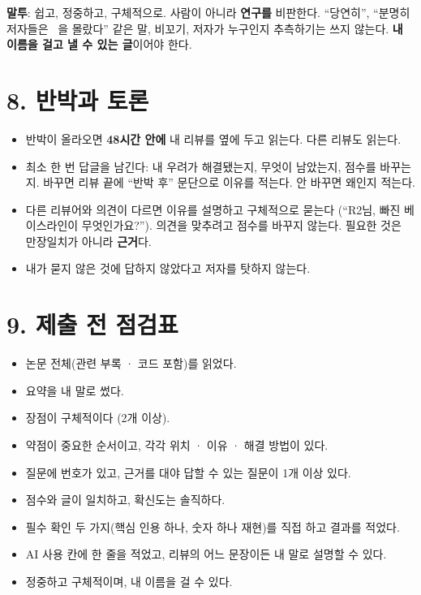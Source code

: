 \documentclass[11pt]{article}
\begin{document}
\noindent\textbf{말투}: 쉽고, 정중하고, 구체적으로. 사람이 아니라 \textbf{연구를} 비판한다. ``당연히'', ``분명히 저자들은 ~을 몰랐다'' 같은 말, 비꼬기, 저자가 누구인지 추측하기는 쓰지 않는다. \textbf{내 이름을 걸고 낼 수 있는 글}이어야 한다.

\section*{8. 반박과 토론}
\begin{itemize}
\item 반박이 올라오면 \textbf{48시간 안에} 내 리뷰를 옆에 두고 읽는다. 다른 리뷰도 읽는다.
\item 최소 한 번 답글을 남긴다: 내 우려가 해결됐는지, 무엇이 남았는지, 점수를 바꾸는지. 바꾸면 리뷰 끝에 ``반박 후'' 문단으로 이유를 적는다. 안 바꾸면 왜인지 적는다.
\item 다른 리뷰어와 의견이 다르면 이유를 설명하고 구체적으로 묻는다 (``R2님, 빠진 베이스라인이 무엇인가요?''). 의견을 맞추려고 점수를 바꾸지 않는다. 필요한 것은 만장일치가 아니라 \textbf{근거}다.
\item 내가 묻지 않은 것에 답하지 않았다고 저자를 탓하지 않는다.
\end{itemize}

\section*{9. 제출 전 점검표}
\begin{itemize}
\item[$\square$] 논문 전체(관련 부록 · 코드 포함)를 읽었다.
\item[$\square$] 요약을 내 말로 썼다.
\item[$\square$] 장점이 구체적이다 (2개 이상).
\item[$\square$] 약점이 중요한 순서이고, 각각 위치 · 이유 · 해결 방법이 있다.
\item[$\square$] 질문에 번호가 있고, 근거를 대야 답할 수 있는 질문이 1개 이상 있다.
\item[$\square$] 점수와 글이 일치하고, 확신도는 솔직하다.
\item[$\square$] 필수 확인 두 가지(핵심 인용 하나, 숫자 하나 재현)를 직접 하고 결과를 적었다.
\item[$\square$] AI 사용 칸에 한 줄을 적었고, 리뷰의 어느 문장이든 내 말로 설명할 수 있다.
\item[$\square$] 정중하고 구체적이며, 내 이름을 걸 수 있다.
\end{itemize}
\end{document}
